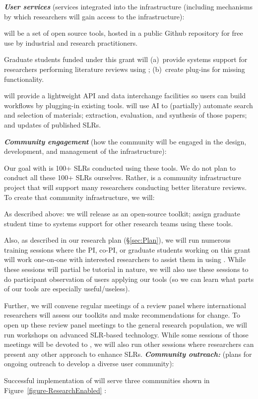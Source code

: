 \ei
 {\bf {\em  User services}}  (services   integrated into the infrastructure 
(including mechanisms by which researchers will gain access to the infrastructure):
\bi
\item 
{\IT} will be a set of open source tools, hosted in a public Github repository for free use by industrial and research practitioners. 
\item
Graduate students funded under this grant will 
(a)~provide systems support for researchers performing literature reviews using {\IT};
(b)~create plug-ins for missing functionality. 
\item
{\IT}  will provide a lightweight API and data interchange facilities so users can build workflows by plugging-in existing tools.
{\IT}  will use
AI to (partially) automate   search and selection of materials; extraction, evaluation, and synthesis of those papers; and updates of published
SLRs.


\ei 
{\bf {\em  Community engagement}} (how the community will be engaged in the design, development, and management of the infrastructure):
\bi
\item
Our goal with {\IT} is 100+ SLRs conducted using these tools. We do not plan to conduct all these 100+ SLRs ourselves.  Rather,    {\IT}
is a community infrastructure project that will support many researchers conducting better 
literature reviews. 
To create that community infrastructure, we will:
\be
\item As described above: we will release {\IT} as an open-source toolkit; assign graduate student time to systems support for other research teams using these tools.
\item
Also, as described in our research plan (\S\ref{sec:Plan}), we will  run numerous  training sessions where the PI, co-PI, or graduate students working on this grant will work one-on-one with interested
researchers to assist them in using {\IT}. While these sessions will
partial be tutorial in nature, we will also use these sessions
to do participant observation of users applying our tools (so we can learn what parts of our tools are especially useful/useless).
\item Further, we will convene regular meetings of a
review panel  where international researchers will assess our toolkits and make recommendations for change. To open up these review
panel meetings to the general research population, we will run workshops on  advanced SLR-based technology. While some sessions of those meetings will be devoted to {\IT}, we will also run other sessions where researchers can present any other approach to enhance SLRs.
\ee
\ei
{\bf {\em Community outreach:}}  (plans for ongoing outreach to develop a diverse user community):
\bi
\item
Successful implementation of {\IT} will serve three communities shown in 
Figure~\ref{figure-ResearchEnabled} :
\be

